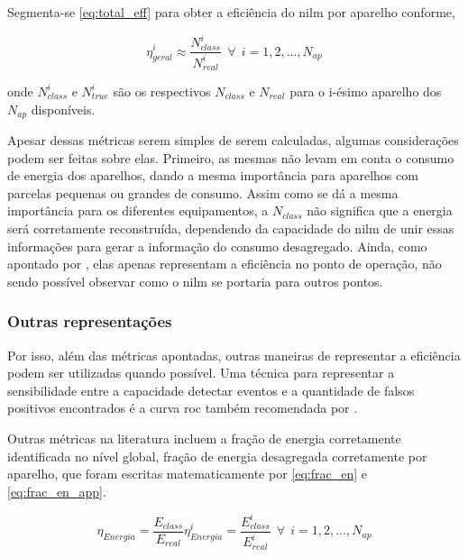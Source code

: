 Segmenta-se \ref{eq:total_eff} para obter a eficiência do \gls{nilm}
por aparelho conforme,

\begin{equation}\label{eq:app_eff}
\eta_{geral}^i\approx\frac{N_{class}^i}{N_{real}^i} ~~ \forall ~~ i =
1,2,...,N_{ap}
\end{equation}

\noindent onde $N_{class}^i$ e $N_{true}^i$ são os respectivos
$N_{class}$ e $N_{real}$ para o i-ésimo aparelho dos $N_{ap}$
disponíveis.

Apesar dessas métricas serem simples de serem calculadas, algumas
considerações podem ser feitas sobre elas. Primeiro, as mesmas
não levam em conta o consumo de energia dos aparelhos, dando a mesma
importância para aparelhos com parcelas pequenas ou grandes de
consumo. Assim como se dá a mesma importância para os diferentes
equipamentos, a $N_{class}$ não significa que a energia será
corretamente reconstruída, dependendo da capacidade do \gls{nilm} de
unir essas informações para gerar a informação do consumo desagregado.
Ainda, como apontado por \cite{nilm_zeifman_review_2011},
elas apenas representam a eficiência no ponto de operação, não sendo
possível observar como o \gls{nilm} se portaria para outros pontos. 

\subsubsection{Outras representações}
\label{sssec:outras_eff}

Por isso, além das métricas apontadas, outras maneiras de representar
a eficiência podem ser utilizadas quando possível. Uma técnica para
representar a sensibilidade entre a capacidade detectar eventos e a
quantidade de falsos positivos encontrados é a curva \gls{roc} também
recomendada por \cite{nilm_zeifman_review_2011}.

Outras métricas na literatura incluem a fração de energia corretamente
identificada no nível global, fração de energia
desagregada corretamente por aparelho, que foram escritas
matematicamente por \ref{eq:frac_en} e \ref{eq:frac_en_app}. 

\begin{subequations}\label{eq:en_eff}
\begin{equation}\label{eq:frac_en}
\eta_{Energia} = \frac{E_{class}}{E_{real}}
\end{equation}
\begin{equation}\label{eq:frac_en_app}
\eta_{Energia}^i = \frac{E_{class}^i}{E_{real}^i} ~~ \forall ~~ 
i = 1,2,...,N_{ap}
\end{equation}
\end{subequations}

